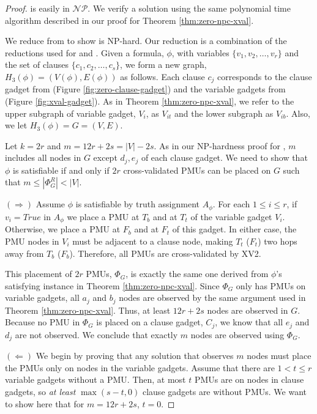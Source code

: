 \begin{proof}
\xvalpart is easily in $\mathcal{NP}$. We verify a \xvalpart solution using the same polynomial time algorithm described in our proof 
for Theorem \ref{thm:zero-npc-xval}. %

We reduce from \sat to show \xvalpart is NP-hard. Our reduction is a combination
of the reductions used for \maxinc and \xvals. Given a \sat formula, $\phi$,
with variables $\{v_1,v_2, \dots , v_r\}$ and the set of clauses $\{c_1,c_2,
\dots , c_s \}$, we form a new graph, $H_3(\phi) = (V(\phi),E(\phi))$  as follows. Each clause $c_j$
corresponds to the clause gadget from \maxinc (Figure \ref{fig:zero-clause-gadget}) 
and the variable gadgets from \xval (Figure \ref{fig:xval-gadget}). 
As in Theorem \ref{thm:zero-npc-xval}, we refer to the upper subgraph of variable gadget, $V_i$, 
as $V_{it}$ and the lower subgraph as $V_{ib}$.  Also, we let $H_3(\phi) = G=(V,E)$.

Let $k = 2r$ and $m = 12r + 2s = |V| - 2s$. As in our NP-hardness proof for \maxincs, $m$ includes all nodes in $G$
except $d_j,e_j$ of each clause gadget. We need to show that $\phi$ is satisfiable if and only if
$2r$ cross-validated PMUs can be placed on $G$ such that $m \leq |\Phi^R_{G}| < |V|$.

$(\Rightarrow)$ Assume $\phi$ is satisfiable by truth assignment $A_{\phi}$.
For each $1\leq i\leq r$, if $v_i=True$ in $A_{\phi}$ we place a PMU at $T_b$
and at $T_t$ of the variable gadget $V_i$. Otherwise, we place a PMU at $F_b$
and at $F_t$ of this gadget. In either case, the PMU nodes in $V_i$ must be
adjacent to a clause node, making $T_t$ ($F_t$) two hops away from
$T_b$ ($F_b$). Therefore, all PMUs are cross-validated by XV2. 

This placement of $2r$ PMUs, $\Phi_G$, is exactly the same one derived from $\phi$'s satisfying instance in Theorem \ref{thm:zero-npc-xval}.
Since $\Phi_G$ only has PMUs on variable gadgets, all $a_j$ and $b_j$ nodes are observed by the same argument used in Theorem \ref{thm:zero-npc-xval}.
Thus, at least $12r + 2s$ nodes are observed in $G$.
Because no PMU in $\Phi_G$ is placed on a clause gadget, $C_j$, we know that all $e_j$ and $d_j$ are not observed. 
We conclude that exactly $m$ nodes are observed using $\Phi_G$.

$(\Leftarrow)$ 
We begin by proving that any solution that observes $m$ nodes must place the PMUs only on nodes in the variable gadgets. Assume that there are $1<t\leq r$ variable gadgets without a PMU. 
Then, at most $t$ PMUs are on nodes in clause gadgets, so {\it at least} $\max(s-t,0)$ clause gadgets are without PMUs. We want to show here that for $m=12r+2s$, $t=0$.


\end{proof}
